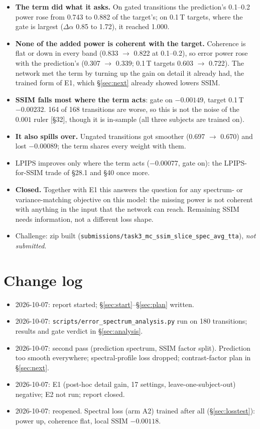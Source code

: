 \documentclass[10pt,a4paper]{article}
\newcommand{\pending}[1][pending]{\textcolor{live}{\textit{#1}}}
\newcommand{\da}{\Delta\alpha}
\begin{document}
\begin{itemize}
  \item \textbf{The term did what it asks.} On gated transitions the prediction's 0.1--0.2 power
        rose from 0.743 to 0.882 of the target's; on 0.1\,T targets, where the gate is largest
        ($\da$ 0.85 to 1.72), it reached 1.000.
  \item \textbf{None of the added power is coherent with the target.} Coherence is flat or
        down in every band (0.833 $\to$ 0.822 at 0.1--0.2), so error power rose with the
        prediction's (0.307 $\to$ 0.339; 0.1\,T targets 0.603 $\to$ 0.722). The network met the
        term by turning up the gain on detail it already had, the trained form of E1, which
        \S\ref{sec:next} already showed lowers SSIM.
  \item \textbf{SSIM falls most where the term acts}: gate on $-0.00149$, target 0.1\,T
        $-0.00232$. 164 of 168 transitions are worse, so this is not the noise of the $0.001$
        ruler [\S32], though it is in-sample (all three subjects are trained on).
  \item \textbf{It also spills over.} Ungated transitions got smoother (0.697 $\to$ 0.670) and
        lost $-0.00089$; the term shares every weight with them.
  \item LPIPS improves only where the term acts ($-0.00077$, gate on): the LPIPS-for-SSIM trade
        of \S28.1 and \S40 once more.
  \item \textbf{Closed.} Together with E1 this answers the question for any spectrum- or
        variance-matching objective on this model: the missing power is not coherent with
        anything in the input that the network can reach. Remaining SSIM needs information, not
        a different loss shape.
  \item Challenge: zip built (\texttt{submissions/task3\_mc\_ssim\_slice\_spec\_avg\_tta}),
        \pending[not submitted].
\end{itemize}

\section{Change log}\label{sec:log}

\begin{itemize}
  \item 2026-10-07: report started; \S\ref{sec:start}--\S\ref{sec:plan} written.
  \item 2026-10-07: \texttt{scripts/error\_spectrum\_analysis.py} run on 180 transitions;
        results and gate verdict in \S\ref{sec:analysis}.
  \item 2026-10-07: second pass (prediction spectrum, SSIM factor split). Prediction too smooth
        everywhere; spectral-profile loss dropped; contrast-factor plan in \S\ref{sec:next}.
  \item 2026-10-07: E1 (post-hoc detail gain, 17 settings, leave-one-subject-out) negative; E2
        not run; report closed.
  \item 2026-10-07: reopened. Spectral loss (arm A2) trained after all
        (\S\ref{sec:losstest}): power up, coherence flat, local SSIM $-0.00118$.
\end{itemize}
\end{document}
